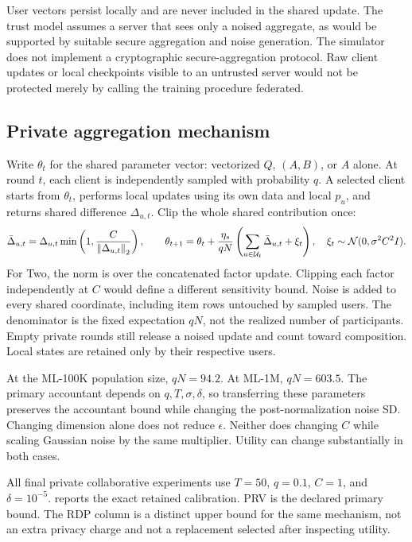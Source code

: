 User vectors persist locally and are never included in the shared update.
The trust model assumes a server that sees only a noised aggregate, as would
be supported by suitable secure aggregation and noise generation. The simulator
does not implement a cryptographic secure-aggregation protocol. Raw client
updates or local checkpoints visible to an untrusted server would not be
protected merely by calling the training procedure federated.

\subsection{Private aggregation mechanism}
Write $\theta_t$ for the shared parameter vector: vectorized $Q$, $(A,B)$, or
$A$ alone. At round $t$, each client is independently sampled with probability
$q$. A selected client starts from $\theta_t$, performs local updates using its
own data and local $p_u$, and returns shared difference $\Delta_{u,t}$. Clip
the whole shared contribution once:
\begin{equation}
 \bar\Delta_{u,t}=\Delta_{u,t}
 \min\left(1,\frac{C}{\left\lVert \Delta_{u,t}\right\rVert_2}\right),\qquad
 \theta_{t+1}=\theta_t+
 \frac{\eta_s}{qN}\left(\sum_{u\in\mathcal U_t}\bar\Delta_{u,t}
            +\xi_t\right),
 \quad\xi_t\sim\mathcal N(0,\sigma^2C^2I).
 \label{eq:aggregate}
\end{equation}
For Two, the norm is over the concatenated factor update. Clipping each factor
independently at $C$ would define a different sensitivity bound. Noise is added
to every shared coordinate, including item rows untouched by sampled users.
The denominator is the fixed expectation $qN$, not the realized number of
participants. Empty private rounds still release a noised update and count
toward composition. Local states are retained only by their respective users.

At the ML-100K population size, $qN=94.2$. At ML-1M, $qN=603.5$. The primary
accountant depends on $q,T,\sigma,\delta$, so transferring these parameters
preserves the accountant bound while changing the post-normalization noise SD.
Changing dimension alone does not reduce $\epsilon$. Neither does changing
$C$ while scaling Gaussian noise by the same multiplier. Utility can change
substantially in both cases.


All final private collaborative experiments use $T=50$, $q=0.1$, $C=1$, and
$\delta=10^{-5}$.  reports the exact retained calibration.
PRV is the declared primary bound. The RDP column is a distinct upper bound
for the same mechanism, not an extra privacy charge and not a replacement
selected after inspecting utility.

